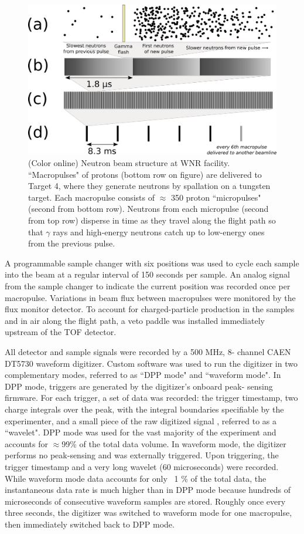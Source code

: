 \documentclass[twocolumn,secnumarabic,amssymb, nobibnotes, aps, prl,
superscriptaddress, nobalancelastpage]{revtex4}
\begin{document}
\begin{figure}
    \includegraphics[scale=0.4]{figures/beamStructure.png}
    \caption{(Color online) Neutron beam structure at WNR facility.
        ``Macropulses" of protons (bottom row on figure) are delivered to Target 
        4, where they generate
        neutrons by spallation on a tungsten target. Each macropulse consists of
        $\approx$ 350 proton ``micropulses" (second from bottom row). Neutrons
        from each micropulse (second from top row) disperse in
time as they travel along the flight path so that $\gamma$ rays and high-energy 
neutrons catch up
to low-energy ones from the previous pulse.}
    \label{BeamStructure}
\end{figure}

A programmable sample changer with six positions
was used to cycle each sample into the beam at a regular interval of 150 seconds 
per sample. An analog signal from the sample changer to indicate the current
position was recorded once per macropulse. Variations in beam flux 
between macropulses were monitored by the flux monitor detector. To account for 
charged-particle production in the 
samples and in air along the flight path, a veto paddle was installed immediately
upstream of the TOF detector.

All detector and sample signals were recorded by a 500 MHz, 8-
channel CAEN DT5730 waveform digitizer. Custom software was used to run the 
digitizer in two complementary modes, referred to as ``DPP mode" and ``waveform 
mode". In DPP mode, triggers are generated by the digitizer's onboard peak-
sensing firmware. For each trigger, a set of data was recorded: the trigger 
timestamp, two charge integrals over the peak, with the integral boundaries 
specifiable by the experimenter, and a small piece of the raw digitized signal
, referred to as a ``wavelet". DPP mode was used for the vast majority of the 
experiment and accounts for $\approx$99\% of the total data volume. In waveform mode, 
the digitizer performs no peak-sensing and was externally triggered. Upon 
triggering, the trigger timestamp and a very long wavelet (60 microseconds) 
were recorded. While waveform mode data accounts for only ~1
\% of the total data, the instantaneous data rate is much higher than in DPP 
mode because hundreds of microseconds of consecutive waveform samples are 
stored. Roughly once every three seconds, the digitizer was switched to 
waveform mode for one macropulse, then immediately switched back to DPP mode.  
\end{document}
